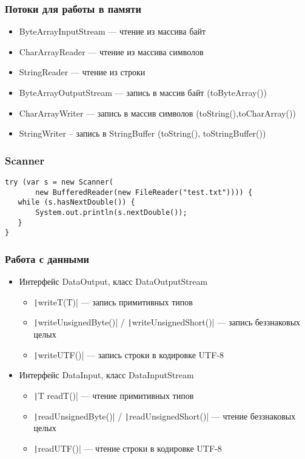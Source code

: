 \documentclass[xetex,mathserif,serif]{beamer}
\begin{document}
	\begin{frame}
		\frametitle{Потоки для работы в памяти}
		\begin{itemize}
			\item ByteArrayInputStream --- чтение из массива байт
			\item CharArrayReader --- чтение из массива символов
			\item StringReader --- чтение из строки
			\item ByteArrayOutputStream --- запись в массив байт (toByteArray())
			\item CharArrayWriter --- запись в массив символов (toString(),toCharArray())
			\item StringWriter – запись в StringBuffer (toString(), toStringBuffer())
		\end{itemize}
	\end{frame}

	\begin{frame}[fragile]
		\frametitle{Scanner}
		\begin{verbatim}
try (var s = new Scanner(
       new BufferedReader(new FileReader("test.txt")))) {
   while (s.hasNextDouble()) {
       System.out.println(s.nextDouble());
   }
}
		\end{verbatim}
	\end{frame}

	\begin{frame}
		\frametitle{Работа с данными}
		\begin{itemize}
			\item Интерфейс DataOutput, класс DataOutputStream
			\begin{itemize}
				\item \texttt|writeT(T)| --- запись примитивных типов
				\item \texttt|writeUnsignedByte()| / \texttt|writeUnsignedShort()| --- запись беззнаковых целых
				\item \texttt|writeUTF()| --- запись строки в кодировке UTF-8
			\end{itemize}
			\item Интерфейс DataInput, класс DataInputStream
			\begin{itemize}
				\item \texttt|T readT()| --- чтение примитивных типов
				\item \texttt|readUnsignedByte()| / \texttt|readUnsignedShort()| --- чтение беззнаковых целых
				\item \texttt|readUTF()| --- чтение строки в кодировке UTF-8
			\end{itemize}
		\end{itemize}
	\end{frame}
\end{document}
